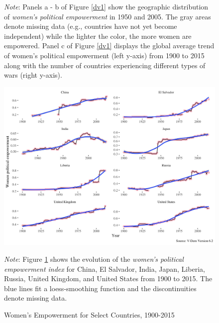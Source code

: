 \documentclass [12pt] {article}
\renewcommand{\footnotesize}{\scriptsize} %
\begin{document}
\begin{figure}[h]
  \begin{flushleft}  
        {\footnotesize {\it Note}: Panels a - b of Figure \ref{dv1} show the geographic distribution of {\it women's political empowerment} in 1950 and 2005. The gray areas denote missing data (e.g., countries have not yet become independent) while the lighter the color, the more women are empowered. Panel c of  Figure \ref{dv1} displays the global average trend of women's political empowerment (left y-axis)  from 1900 to 2015 along with the number of countries experiencing different types of wars (right y-axis).}
       \end{flushleft} 
\end{figure}


\begin{figure}[h]
   \centering
    \caption{Women's Empowerment for Select Countries, 1900-2015 }
    \label{dv2}
  \includegraphics[scale=.2]{Fig2.jpg}
  \begin{flushleft}  
        {\footnotesize {\it Note}: Figure \ref{dv2} shows the evolution of the {\it women's political empowerment index} for China, El Salvador, India, Japan, Liberia,  Russia, United Kingdom, and United States from 1900 to 2015. The blue lines fit a loess-smoothing function and the discontinuities denote missing data.}
       \end{flushleft} 
\end{figure}
\end{document}
